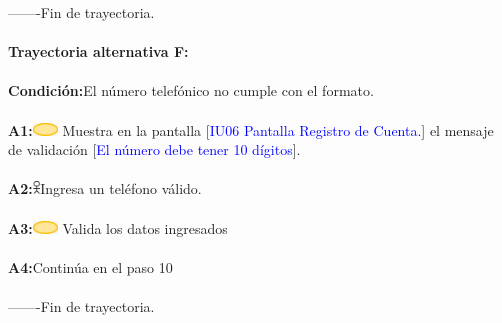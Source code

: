        -------Fin de  trayectoria. \\\\

                    \textbf{Trayectoria alternativa F:}\\\\
                        \textbf{Condición:}El número telefónico no cumple con el formato.\\\\
                        \textbf{A1:}\includegraphics[width=0.0500\textwidth]{Figuras/sistema.png} Muestra en la pantalla [\textcolor{blue}{IU06 Pantalla Registro de Cuenta}.] el mensaje de validación [\textcolor{blue}{El número debe tener 10 dígitos}].  \\\\  
                        \textbf{A2:}\includegraphics[width=0.0150\textwidth]{Figuras/persona.png}Ingresa un teléfono válido.\\\\
                        \textbf{A3:}\includegraphics[width=0.0500\textwidth]{Figuras/sistema.png} Valida los datos ingresados\\\\
                        \textbf{A4:}Continúa en el paso 10 \\\\
                       
        -------Fin de  trayectoria. \\\\

